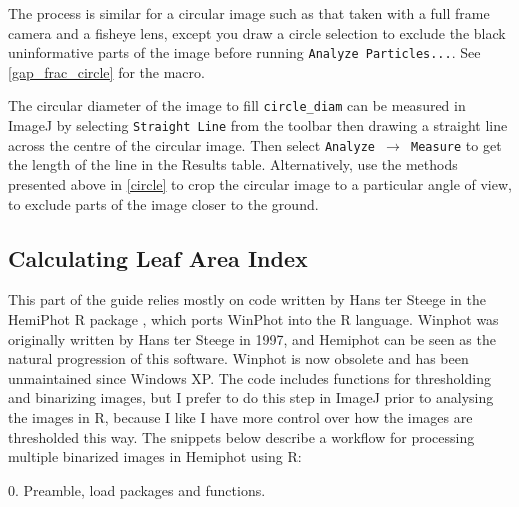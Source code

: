 \documentclass[11pt,a4paper]{article}
\newcommand\menu[1]{\texttt{\color{blue}#1}}
\newcommand\file[1]{\texttt{\underline{#1}}}
\begin{document}
\begin{minipage}{\linewidth}

\end{minipage}

The process is similar for a circular image such as that taken with a full frame camera and a fisheye lens, except you draw a circle selection to exclude the black uninformative parts of the image before running \menu{Analyze Particles...}. See \autoref{gap_frac_circle} for the macro. 

\begin{minipage}{\linewidth}

\end{minipage}

The circular diameter of the image to fill \verb|circle_diam| can be measured in ImageJ by selecting \menu{Straight Line} from the toolbar then drawing a straight line across the centre of the circular image. Then select \menu{Analyze $\rightarrow$ Measure} to get the length of the line in the Results table. Alternatively, use the methods presented above in \autoref{circle} to crop the circular image to a particular angle of view, to exclude parts of the image closer to the ground.

\subsection{Calculating Leaf Area Index}

This part of the guide relies mostly on code written by Hans ter Steege in the HemiPhot R package \citep{Steege2018}, which ports WinPhot into the R language. Winphot was originally written by Hans ter Steege in 1997, and Hemiphot can be seen as the natural progression of this software. Winphot is now obsolete and has been unmaintained since Windows XP. The code includes functions for thresholding and binarizing images, but I prefer to do this step in ImageJ prior to analysing the images in R, because I like I have more control over how the images are thresholded this way. The snippets below describe a workflow for processing multiple binarized images in Hemiphot using R:

\vspace{0.5cm}
\begin{minipage}{\linewidth}
0. Preamble, load packages and functions.

\end{minipage}
\end{document}
